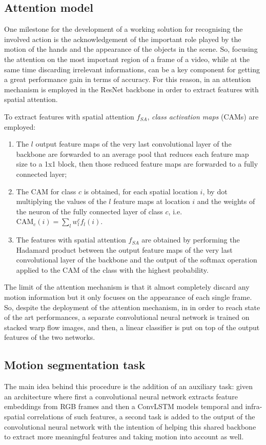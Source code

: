 \documentclass[10pt,twocolumn,letterpaper]{article}
\begin{document}
\subsection{Attention model}
\label{par:AttentionModel}
One milestone for the development of a working solution for recognising the involved action is the acknowledgement of the important role played by the motion of the hands and the appearance of the objects in the scene. So, focusing the attention on the most important region of a frame of a video, while at the same time discarding irrelevant informations, can be a key component for getting a great performance gain in terms of accuracy. For this reason, in \cite{Ego-RNN} an attention mechanism is employed in the ResNet backbone in order to extract features with spatial attention.

To extract features with spatial attention $f_{SA}$, \textit{class activation maps} (CAMs) are employed:
\begin{enumerate}
	\item The $l$ output feature maps of the very last convolutional layer of the backbone are forwarded to an average pool that reduces each feature map size to a 1x1 block, then those reduced feature maps are forwarded to a fully connected layer;
	\item The CAM for class $c$ is obtained, for each spatial location $i$, by dot multiplying the values of the $l$ feature maps at location $i$ and the weights of the neuron of the fully connected layer of class $c$, i.e. ${\text{CAM}_c(i) = \sum_l w_l^c f_l(i)}$. 
	\item The features with spatial attention $f_{SA}$ are obtained by performing the Hadamard product between the output feature maps of the very last convolutional layer of the backbone and the output of the softmax operation applied to the CAM of the class with the highest probability.
\end{enumerate}

The limit of the attention mechanism is that it almost completely discard any motion information but it only focuses on the appearance of each single frame. So, despite the deployment of the attention mechanism, in \cite{planamente2020joint} in order to reach state of the art performances, a separate convolutional neural network is trained on stacked warp flow images, and then, a linear classifier is put on top of the output features of the two networks.

\subsection{Motion segmentation task}
The main idea behind this procedure is the addition of an auxiliary task: given an architecture where first a convolutional neural network extracts feature embeddings from RGB frames and then a ConvLSTM models temporal and infra-spatial correlations of such features, a second task is added to the output of the convolutional neural network with the intention of helping this shared backbone to extract more meaningful features and taking motion into account as well.
\end{document}
